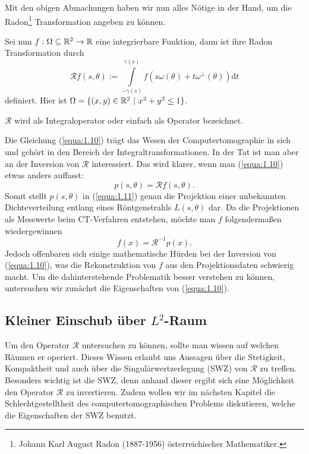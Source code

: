 Mit den obigen Abmachungen haben wir nun alles Nötige in der Hand, um die Radon\footnote{\label{foot:4} Johann Karl August Radon (1887-1956) österreichischer Mathematiker.} Transformation angeben zu können. 
\begin{Definition}
	Sei nun $f:\Omega \subseteq \mathbb{R}^2 \rightarrow \mathbb{R}$ eine integrierbare Funktion, dann ist ihre Radon Transformation durch
	\begin{equation}
		\mathcal{R}f(s,\theta) := \int\limits_{-\gamma(s)}^{\gamma(s)} f(s\omega(\theta) + t\omega^{\perp}(\theta)) \mbox{d}t
		\label{equa:1.10}
	\end{equation}
	definiert. Hier ist $\Omega = \{ (x,y) \in \mathbb{R}^2 \ | \ x^2 + y^2 \leq 1 \}$.
	\label{def.1}
\end{Definition}

\begin{Bemerkung}
	$\mathcal{R}$ wird als Integraloperator oder einfach als Operator bezeichnet.
	\label{bem:1} 
\end{Bemerkung}

Die Gleichung (\ref{equa:1.10}) trägt das Wesen der Computertomographie in sich und gehört in den Bereich der Integraltransformationen. In der Tat ist man aber an der Inversion von $\mathcal{R}$ interessiert. Das wird klarer, wenn man (\ref{equa:1.10}) etwas anders auffasst:
\begin{equation}
	p(s,\theta) = \mathcal{R}f(s,\theta).
	\label{equa:1.11}
\end{equation}
Somit stellt $p(s,\theta)$ in (\ref{equa:1.11}) genau die Projektion einer unbekannten Dichteverteilung entlang eines Röntgenstrahls $L(s,\theta)$ dar. Da die Projektionen als Messwerte beim CT-Verfahren entstehen, möchte man $f$ folgendermaßen wiedergewinnen 
\begin{equation}
	f(x) = \mathcal{R}^{-1}p(x).
	\label{equa:1.12}
\end{equation}
Jedoch offenbaren sich einige mathematische Hürden bei der Inversion von (\ref{equa:1.10}), was die Rekonstruktion von $f$ aus den Projektionsdaten schwierig macht. Um die dahinterstehende Problematik besser verstehen zu können, untersuchen wir zunächst die Eigenschaften von (\ref{equa:1.10}).

\subsection*{Kleiner Einschub über $L^2$-Raum}
\label{cha:1.2.1}

Um den Operator $\mathcal{R}$ untersuchen zu können, sollte man wissen auf welchen Räumen er operiert. Dieses Wissen erlaubt uns Aussagen über die Stetigkeit, Kompaktheit und auch über die Singulärwertzerlegung (SWZ) von $\mathcal{R}$ zu treffen. Besonders wichtig ist die SWZ, denn anhand dieser ergibt sich eine Möglichkeit den Operator $\mathcal{R}$ zu invertieren. Zudem wollen wir im nächsten Kapitel die Schlechtgestelltheit des computertomographischen Problems diskutieren, welche die Eigenschaften der SWZ benutzt.

